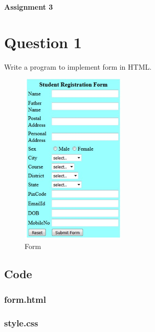\documentclass{article}
\begin{document}
{\centerline{\bfseries \Huge Assignment 3}}

\section*{Question 1}
Write a program to implement form in HTML.
\begin{figure}[H]
    \caption{Form}
    \centering
    \includegraphics[width=5cm]{img/a.jpg}
\end{figure}

\newpage
\subsection*{Code}
\subsubsection*{form.html}

\subsubsection*{style.css}

\newpage
\end{document}
